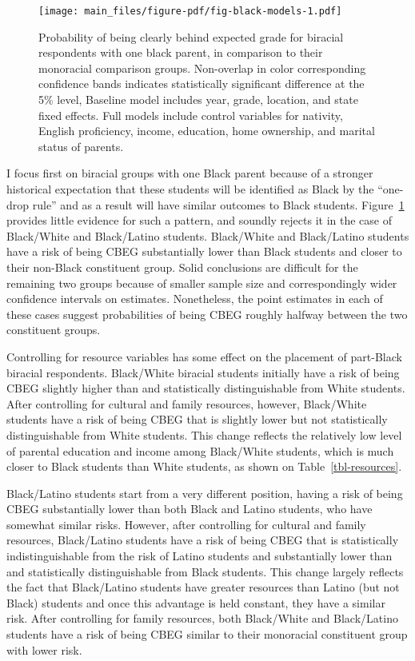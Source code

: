 \documentclass[
  letterpaper,
  DIV=11,
  numbers=noendperiod]{scrartcl}
\begin{document}
\begin{figure}[p]

{\centering \texttt{[image: main\_files/figure-pdf/fig-black-models-1.pdf]}

}

\caption{\label{fig-black-models}Probability of being clearly behind
expected grade for biracial respondents with one black parent, in
comparison to their monoracial comparison groups. Non-overlap in color
corresponding confidence bands indicates statistically significant
difference at the 5\% level, Baseline model includes year, grade,
location, and state fixed effects. Full models include control variables
for nativity, English proficiency, income, education, home ownership,
and marital status of parents.}

\end{figure}

I focus first on biracial groups with one Black parent because of a
stronger historical expectation that these students will be identified
as Black by the ``one-drop rule'' and as a result will have similar
outcomes to Black students. Figure~\ref{fig-black-models} provides
little evidence for such a pattern, and soundly rejects it in the case
of Black/White and Black/Latino students. Black/White and Black/Latino
students have a risk of being CBEG substantially lower than Black
students and closer to their non-Black constituent group. Solid
conclusions are difficult for the remaining two groups because of
smaller sample size and correspondingly wider confidence intervals on
estimates. Nonetheless, the point estimates in each of these cases
suggest probabilities of being CBEG roughly halfway between the two
constituent groups.

Controlling for resource variables has some effect on the placement of
part-Black biracial respondents. Black/White biracial students initially
have a risk of being CBEG slightly higher than and statistically
distinguishable from White students. After controlling for cultural and
family resources, however, Black/White students have a risk of being
CBEG that is slightly lower but not statistically distinguishable from
White students. This change reflects the relatively low level of
parental education and income among Black/White students, which is much
closer to Black students than White students, as shown on
Table~\ref{tbl-resources}.

Black/Latino students start from a very different position, having a
risk of being CBEG substantially lower than both Black and Latino
students, who have somewhat similar risks. However, after controlling
for cultural and family resources, Black/Latino students have a risk of
being CBEG that is statistically indistinguishable from the risk of
Latino students and substantially lower than and statistically
distinguishable from Black students. This change largely reflects the
fact that Black/Latino students have greater resources than Latino (but
not Black) students and once this advantage is held constant, they have
a similar risk. After controlling for family resources, both Black/White
and Black/Latino students have a risk of being CBEG similar to their
monoracial constituent group with lower risk.
\end{document}
